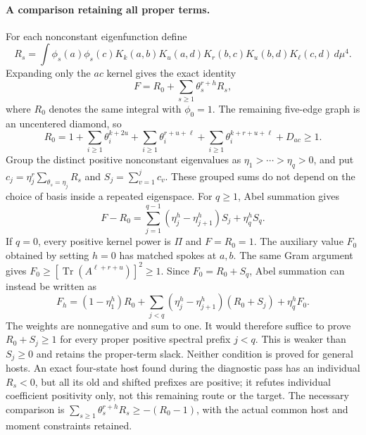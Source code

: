 \paragraph{A comparison retaining all proper terms.}
For each nonconstant eigenfunction define
\[
 R_s=\int\phi_s(a)\phi_s(c)
 K_k(a,b)K_u(a,d)K_r(b,c)K_u(b,d)K_\ell(c,d)\,d\mu^4.
\]
Expanding only the $ac$ kernel gives the exact identity
\[
 F=R_0+\sum_{s\geq1}\theta_s^{r+h}R_s,
\]
where $R_0$ denotes the same integral with $\phi_0=1$.
The remaining five-edge graph is an uncentered diamond, so
\[
 R_0=1+\sum_{i\geq1}\theta_i^{k+2u}
       +\sum_{i\geq1}\theta_i^{r+u+\ell}
       +\sum_{i\geq1}\theta_i^{k+r+u+\ell}+D_{ac}\geq1.
\]
Group the distinct positive nonconstant eigenvalues as
$\eta_1>\cdots>\eta_q>0$, and put
$c_j=\eta_j^r\sum_{\theta_s=\eta_j}R_s$ and
$S_j=\sum_{v=1}^jc_v$.  These grouped sums do not depend on the choice
of basis inside a repeated eigenspace.  For $q\geq1$, Abel summation gives
\[
 F-R_0=\sum_{j=1}^{q-1}(\eta_j^h-\eta_{j+1}^h)S_j
             +\eta_q^hS_q.
\]
If $q=0$, every positive kernel power is $\Pi$ and $F=R_0=1$.
The auxiliary value $F_0$ obtained by setting $h=0$ has matched spokes
at $a,b$.  The same Gram argument gives
$F_0\geq[\operatorname{Tr}(A^{\ell+r+u})]^2\geq1$.
Since $F_0=R_0+S_q$, Abel summation can instead be written as
\[
 F_h=(1-\eta_1^h)R_0
     +\sum_{j<q}(\eta_j^h-\eta_{j+1}^h)(R_0+S_j)
     +\eta_q^hF_0.
\]
The weights are nonnegative and sum to one.  It would therefore suffice
to prove $R_0+S_j\geq1$ for every proper positive spectral prefix $j<q$.
This is weaker than $S_j\geq0$ and retains the proper-term slack.
Neither condition is proved for general hosts.  An exact four-state
host found during the diagnostic pass has an individual $R_s<0$, but
all its old and shifted prefixes are positive; it refutes individual
coefficient positivity only, not this remaining route or the target.
The necessary comparison is
$\sum_{s\geq1}\theta_s^{r+h}R_s\geq-(R_0-1)$, with the actual common
host and moment constraints retained.

